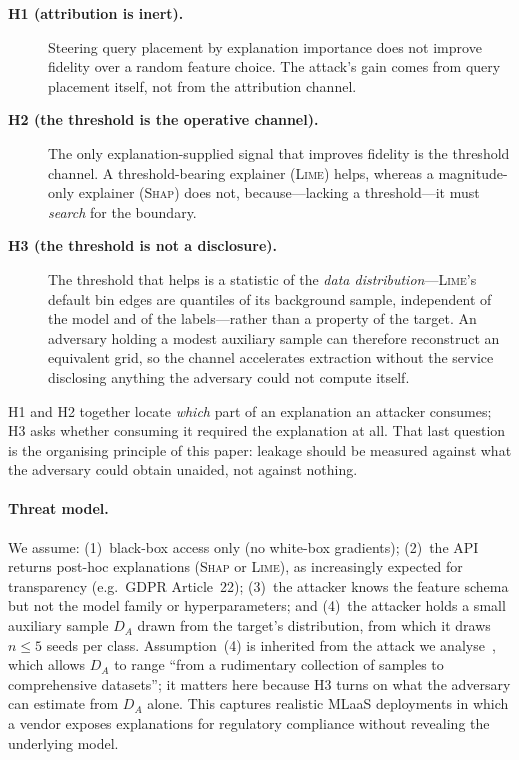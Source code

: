 \documentclass[sigconf,anonymous,review]{acmart}
\begin{document}
\begin{description}
  \item[\textbf{H1 (attribution is inert).}] Steering query placement by explanation
  importance does not improve fidelity over a random feature choice. The attack's gain
  comes from query placement itself, not from the attribution channel.
  \item[\textbf{H2 (the threshold is the operative channel).}] The only explanation-supplied
  signal that improves fidelity is the threshold channel. A threshold-bearing explainer
  (\textsc{Lime}) helps, whereas a magnitude-only explainer (\textsc{Shap}) does not,
  because---lacking a threshold---it must \emph{search} for the boundary.
  \item[\textbf{H3 (the threshold is not a disclosure).}] The threshold that helps is a
  statistic of the \emph{data distribution}---\textsc{Lime}'s default bin edges are quantiles
  of its background sample, independent of the model and of the labels---rather than a
  property of the target. An adversary holding a modest auxiliary sample can therefore
  reconstruct an equivalent grid, so the channel accelerates extraction without the service
  disclosing anything the adversary could not compute itself.
\end{description}
H1 and H2 together locate \emph{which} part of an explanation an attacker consumes; H3 asks
whether consuming it required the explanation at all. That last question is the organising
principle of this paper: leakage should be measured against what the adversary could obtain
unaided, not against nothing.

\paragraph{Threat model.}
We assume: (1)~black-box access only (no white-box gradients); (2)~the API returns
post-hoc explanations (\textsc{Shap} or \textsc{Lime}), as increasingly expected for
transparency (e.g.\ GDPR Article~22); (3)~the attacker knows the feature schema but
not the model family or hyperparameters; and (4)~the attacker holds a small auxiliary
sample $D_A$ drawn from the target's distribution, from which it draws $n{\le}5$ seeds per
class. Assumption~(4) is inherited from the attack we analyse~\cite{oksuz2024autolycus},
which allows $D_A$ to range ``from a rudimentary collection of samples to comprehensive
datasets''; it matters here because H3 turns on what the adversary can estimate from $D_A$
alone. This captures realistic MLaaS deployments in which a vendor exposes explanations for
regulatory compliance without revealing the underlying model.
\end{document}
